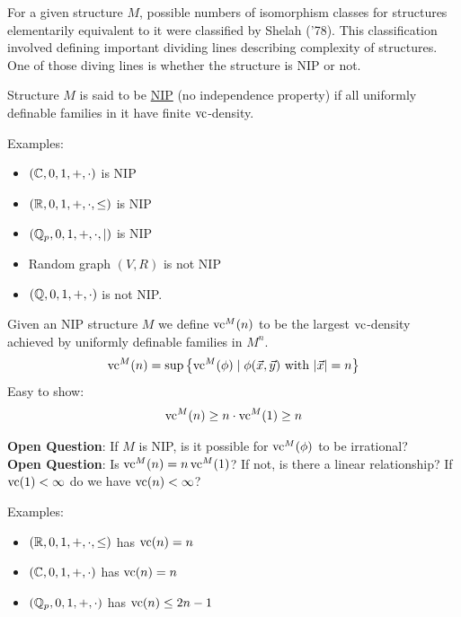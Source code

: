 \documentclass{beamer}
\newcommand{\curly}[1]{\left\{ #1 \right\}}
\newcommand{\defn}{\underline}
\begin{document}
\begin{frame}
	For a given structure $M$, possible numbers of isomorphism classes for structures elementarily equivalent to it were classified by Shelah ('78).
	This classification involved defining important dividing lines describing complexity of structures.
	One of those diving lines is whether the structure is NIP or not.
	\begin{Definition}
		Structure $M$ is said to be \defn{NIP} (no independence property) if all uniformly definable families in it have finite $\operatorname{vc}$-density.
	\end{Definition}
	Examples:
	\begin{itemize}
		\item $(\mathbb{C}, 0, 1, +, \cdot)$ is NIP
		\item $(\mathbb{R}, 0, 1, +, \cdot, \leq)$ is NIP
		\item $(\mathbb{Q}_p, 0, 1, +, \cdot, \mid)$ is NIP
		\item Random graph $(V, R)$ is not NIP
		\item $(\mathbb{Q}, 0, 1, +, \cdot)$ is not NIP.
	\end{itemize}
\end{frame}

\begin{frame}
	Given an NIP structure $M$ we define $\operatorname{vc}^M(n)$ to be the largest $\operatorname{vc}$-density achieved by uniformly definable families in $M^n$.
	\begin{align*}
		\vc^M(n) = \sup \curly{ \vc^M(\phi) \mid \phi(\vec x, \vec y) \text{ with } |\vec x| = n}
	\end{align*}
	Easy to show:
	\begin{align*}
		\operatorname{vc}^M(n) \geq n \cdot \operatorname{vc}^M(1) \geq n
	\end{align*}

	\textbf{Open Question}: If $M$ is NIP, is it possible for $\operatorname{vc}^M(\phi)$ to be irrational? \\
	\textbf{Open Question}: Is $\operatorname{vc}^M(n) = n \operatorname{vc}^M(1)$? If not, is there a linear relationship? If $\operatorname{vc}(1) < \infty$ do we have $\operatorname{vc}(n) < \infty$?
\end{frame}

\begin{frame}
	Examples:
	\begin{itemize}
		\item $(\mathbb{R}, 0, 1, +, \cdot, \leq)$ has $\operatorname{vc}(n) = n$
		\item $(\mathbb{C}, 0, 1, +, \cdot)$ has $\operatorname{vc}(n) = n$
		\item $(\mathbb{Q}_p, 0, 1, +, \cdot)$ has $\operatorname{vc}(n) \leq 2n - 1$
	\end{itemize}
\end{frame}
\end{document}
